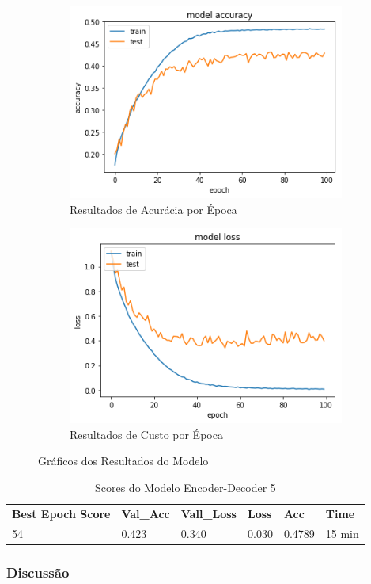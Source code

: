 \begin{figure}[h]
  \centering
  \begin{subfigure}[b]{0.45\linewidth}
    \includegraphics[width=\linewidth]{img/enc-dec-5.png}
    \caption{Resultados de Acurácia por Época}
  \end{subfigure}
  \begin{subfigure}[b]{0.45\linewidth}
    \includegraphics[width=\linewidth]{img/enc-dec-5-loss.png}
    \caption{Resultados de Custo por Época}
  \end{subfigure}
  \caption{Gráficos dos Resultados do Modelo}
  \label{fig:plots5}
\end{figure}

\begin{table}[h]
\centering
\begin{tabular}{llllll}
\textbf{Best Epoch Score} & \textbf{Val\_Acc} & \textbf{Vall\_Loss} & \textbf{Loss} & \textbf{Acc} & \textbf{Time} \\
54 & 0.423 & 0.340 & 0.030 & 0.4789 & 15 min
\end{tabular}
\caption{Scores do Modelo Encoder-Decoder 5}
\label{tab:res-enc-dec-5}
\end{table}

\subsubsection{Discussão}
